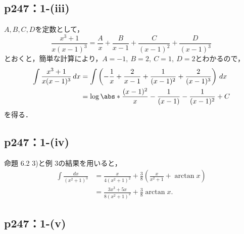 \documentclass[a4paper,10pt,fleqn]{ltjsarticle}
\begin{document}
\subsection*{p247：1-(iii)}

\begin{tleftbar}
    $A,B,C,D$を定数として，
    \[
        \frac{x^3+1}{x(x-1)^3} = \frac{A}{x}+\frac{B}{x-1}+\frac{C}{(x-1)^2}+\frac{D}{(x-1)^3}
    \]
    とおくと，簡単な計算により，$A=-1,~B=2,~C=1,~D=2$とわかるので，
    \begin{align*}
        \int \frac{x^3+1}{x(x-1)^3} \, dx & = \int \left (-\frac{1}{x}+\frac{2}{x-1}+\frac{1}{(x-1)^2}+\frac{2}{(x-1)^3} \right ) \, dx \\
        & = \log \abs*{\frac{(x-1)^2}{x}} -\frac{1}{(x-1)}-\frac{1}{(x-1)^2}+ C
    \end{align*}
    を得る．
\end{tleftbar}


\subsection*{p247：1-(iv)}

\begin{leftbar}
    命題 6.2 3)と例 3の結果を用いると，
    \begin{align*}
      \int \frac{dx}{(x^2 + 1)^3}
      &= \frac{x}{4(x^2 + 1)^2} + \frac{3}{8}(\frac{x}{x^2 + 1} + \arctan x) \\
      &= \frac{3x^3 + 5x}{8(x^2+1)^2} + \frac{3}{8} \arctan x.
    \end{align*}
  \end{leftbar}

\subsection*{p247：1-(v)}
\end{document}
